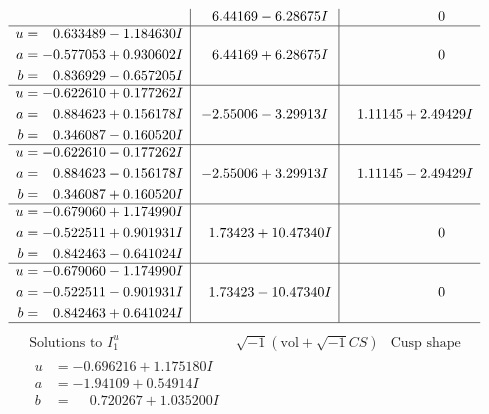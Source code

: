 \documentclass[1p]{elsarticle_modified}
\theoremstyle{definition}
\newcommand{\I}{\sqrt{-1}}
\begin{document}
$$\begin{array}{c|c|c}
 & \phantom{-}6.44169 - 6.28675 I & \phantom{-0.000000 } 0 \\ \hline\begin{aligned}
u &= \phantom{-}0.633489 - 1.184630 I \\
a &= -0.577053 + 0.930602 I \\
b &= \phantom{-}0.836929 - 0.657205 I\end{aligned}
 & \phantom{-}6.44169 + 6.28675 I & \phantom{-0.000000 } 0 \\ \hline\begin{aligned}
u &= -0.622610 + 0.177262 I \\
a &= \phantom{-}0.884623 + 0.156178 I \\
b &= \phantom{-}0.346087 - 0.160520 I\end{aligned}
 & -2.55006 - 3.29913 I & \phantom{-}1.11145 + 2.49429 I \\ \hline\begin{aligned}
u &= -0.622610 - 0.177262 I \\
a &= \phantom{-}0.884623 - 0.156178 I \\
b &= \phantom{-}0.346087 + 0.160520 I\end{aligned}
 & -2.55006 + 3.29913 I & \phantom{-}1.11145 - 2.49429 I \\ \hline\begin{aligned}
u &= -0.679060 + 1.174990 I \\
a &= -0.522511 + 0.901931 I \\
b &= \phantom{-}0.842463 - 0.641024 I\end{aligned}
 & \phantom{-}1.73423 + 10.47340 I & \phantom{-0.000000 } 0 \\ \hline\begin{aligned}
u &= -0.679060 - 1.174990 I \\
a &= -0.522511 - 0.901931 I \\
b &= \phantom{-}0.842463 + 0.641024 I\end{aligned}
 & \phantom{-}1.73423 - 10.47340 I & \phantom{-0.000000 } 0\\
 \hline 
 \end{array}$$\newpage$$\begin{array}{c|c|c}  
\text{Solutions to }I^u_{1}& \I (\text{vol} + \sqrt{-1}CS) & \text{Cusp shape}\\
 \hline 
\begin{aligned}
u &= -0.696216 + 1.175180 I \\
a &= -1.94109 + 0.54914 I \\
b &= \phantom{-}0.720267 + 1.035200 I\end{aligned}

\end{array}$$
\end{document}
